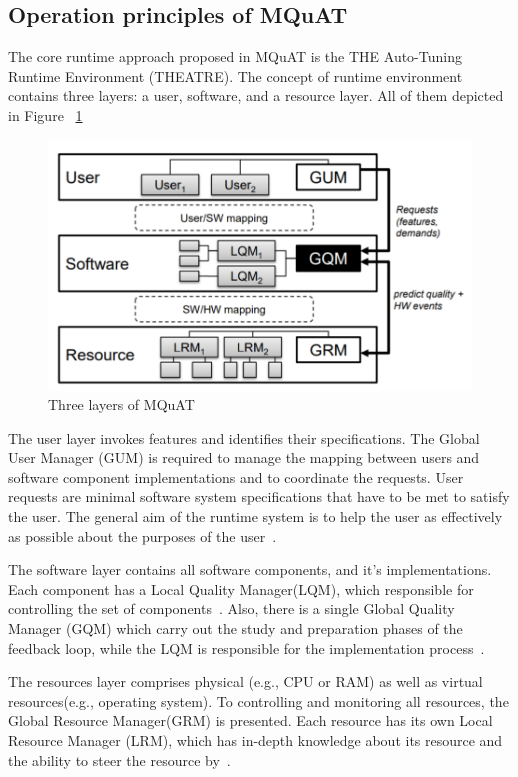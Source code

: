 \subsection{Operation principles of MQuAT}

The core runtime approach proposed in MQuAT is the THE Auto-Tuning Runtime Environment (THEATRE)\cite{gotz10, gotz12}.
The concept of runtime environment contains three layers: a user, software, and a resource layer. All of them depicted in Figure ~\ref{fig:threelayersmquat}

\begin{figure}
	\centering
	\includegraphics[width=\textwidth]{images/ThreeLayersMQuAT}
	\caption[Three layers of MQuAT]{Three layers of MQuAT}
	\label{fig:threelayersmquat}
\end{figure}

The user layer invokes features and identifies their specifications. The  Global  User  Manager  (GUM)  is required to manage the mapping between users and software component implementations and to coordinate the requests. User requests are minimal software system specifications that have to be met to satisfy the user. The general aim of the runtime system is to help the user as effectively as possible about the purposes of the user~\cite{gotz13}.

The software layer contains all software components, and it's implementations. Each component has a Local Quality Manager(LQM), which responsible for controlling the set of components~\cite{gotz13, ahmad18}. Also, there is a single Global Quality Manager (GQM) which carry out the study and preparation phases of the feedback loop, while the LQM is responsible for the implementation process~\cite{gotz13}.

The resources layer comprises physical (e.g., CPU or RAM) as well as virtual resources(e.g., operating system).
To controlling and monitoring all resources, the Global Resource Manager(GRM) is presented. Each resource has its own Local Resource Manager (LRM), which has in-depth knowledge about its resource and the ability to steer the resource by~\cite{gotz13, ahmad18}.

